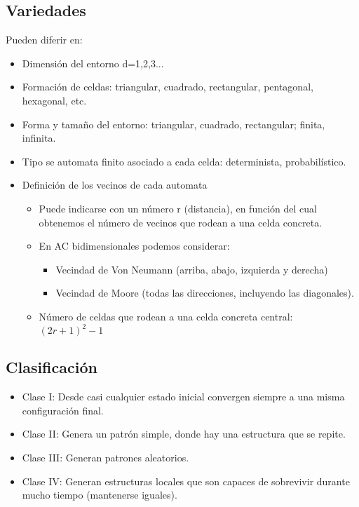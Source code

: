 \subsection{Variedades}
Pueden diferir en:
\begin{itemize}
	\item Dimensión del entorno d=1,2,3...
	\item Formación de celdas: triangular, cuadrado, rectangular, pentagonal, hexagonal, etc.
	\item Forma y tamaño del entorno: triangular, cuadrado, rectangular; finita, infinita.
	\item Tipo se automata finito asociado a cada celda: determinista, probabilístico.
	\item Definición de los vecinos de cada automata
	      \begin{itemize}
		      \item Puede indicarse con un número r (distancia), en función del cual obtenemos el número de vecinos que rodean a una celda concreta.
		      \item En AC bidimensionales podemos considerar:
		            \begin{itemize}
			            \item Vecindad de Von Neumann (arriba, abajo, izquierda y derecha)
			            \item Vecindad de Moore (todas las direcciones, incluyendo las diagonales).
		            \end{itemize}
		      \item Número de celdas que rodean a una celda concreta central: $(2r+1)^2-1$
	      \end{itemize}
\end{itemize}

\subsection{Clasificación}
\begin{itemize}
	\item Clase I: Desde casi cualquier estado inicial convergen siempre a una misma configuración final.
	\item Clase II: Genera un patrón simple, donde hay una estructura que se repite.
	\item Clase III: Generan patrones aleatorios.
	\item Clase IV: Generan estructuras locales que son capaces de sobrevivir durante mucho tiempo (mantenerse iguales).
\end{itemize}

